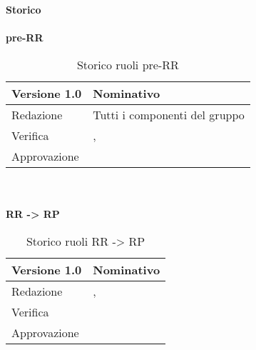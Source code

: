 \newpage
\Large{\textbf{Storico }}\\
\normalsize \\

\noindent \textbf{pre-RR}
\label{tabVers1}
\begin{table}[h]
	\begin{tabular}{p{} p{}}
		\toprule \textbf{Versione 1.0}	&	\textbf{Nominativo}\\
		\midrule Redazione	& Tutti i componenti del gruppo\\
		\midrule Verifica & \PM, \BM\\
		\midrule Approvazione	& \TP\\
		\bottomrule
	\end{tabular}
	\caption{Storico ruoli pre-RR}
\end{table}
\\
\normalsize \\
\noindent \textbf{RR -> RP}
\label{tabVers2}
\begin{table}[h]
	\begin{tabular}{p{} p{}}
		\toprule \textbf{Versione 1.0}	&	\textbf{Nominativo}\\
		\midrule Redazione	& \FM, \BM\\
		\midrule Verifica & \GP\\
		\midrule Approvazione	& \VG\\
		\bottomrule
	\end{tabular}
	\caption{Storico ruoli RR -> RP}
\end{table}